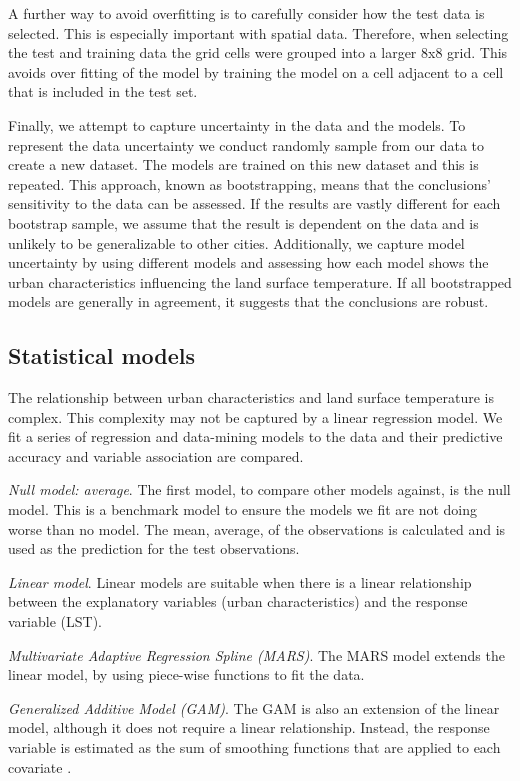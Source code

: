 \documentclass[final,3p,times,twocolumn,sort&compress]{elsarticle}
\begin{document}
A further way to avoid overfitting is to carefully consider how the test data is selected.
This is especially important with spatial data.
Therefore, when selecting the test and training data the grid cells were grouped into a larger 8x8 grid.
This avoids over fitting of the model by training the model on a cell adjacent to a cell that is included in the test set.

Finally, we attempt to capture uncertainty in the data and the models. 
To represent the data uncertainty we conduct randomly sample from our data to create a new dataset.
The models are trained on this new dataset and this is repeated.
This approach, known as bootstrapping, means that the conclusions' sensitivity to the data can be assessed.
If the results are vastly different for each bootstrap sample, we assume that the result is dependent on the data and is unlikely to be generalizable to other cities.
Additionally, we capture model uncertainty by using different models and assessing how each model shows the urban characteristics influencing the land surface temperature.
If all bootstrapped models are generally in agreement, it suggests that the conclusions are robust.


\subsection{Statistical models}
\label{ss:models}
The relationship between urban characteristics and land surface temperature is complex.
This complexity may not be captured by a linear regression model. 
We fit a series of regression and data-mining models to the data and their predictive accuracy and variable association are compared.

\textit{Null model: average}. The first model, to compare other models against, is the null model. 
This is a benchmark model to ensure the models we fit are not doing worse than no model.
The mean, average, of the observations is calculated and is used as the prediction for the test observations.

\textit{Linear model}. Linear models are suitable when there is a linear relationship between the explanatory variables (urban characteristics) and the response variable (LST).

\textit{Multivariate Adaptive Regression Spline (MARS)}. The MARS model extends the linear model, by using piece-wise functions to fit the data. \cite{Friedman1991-of}

\textit{Generalized Additive Model (GAM)}. The GAM is also an extension of the linear model, although it does not require a linear relationship. Instead, the response variable is estimated as the sum of smoothing functions that are applied to each covariate \cite{Hastie1990-cg}.
\end{document}
